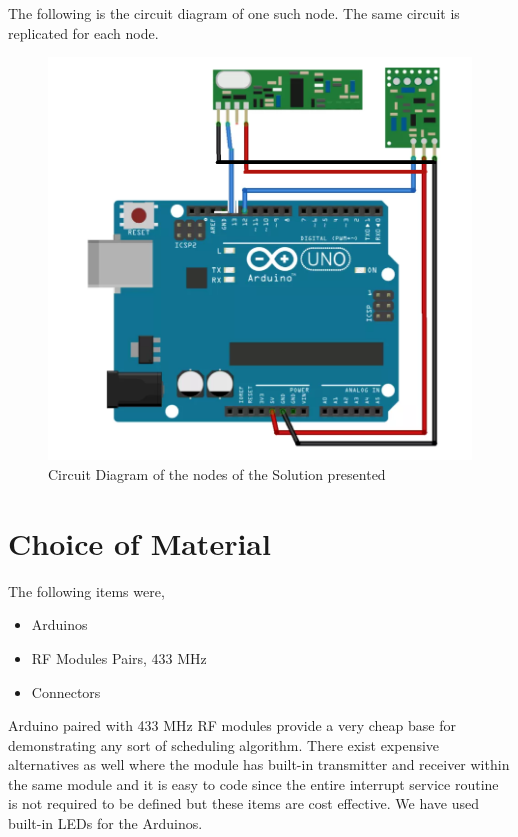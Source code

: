 \documentclass[12pt]{article}
\begin{document}
 The following is the circuit diagram of one such node. The same circuit is replicated for each node.  
 
 \begin{figure}[h]
 \centering
 \includegraphics[scale = 0.35]{circuit1.PNG}
 \caption{Circuit Diagram of the nodes of the Solution presented}
 \end{figure}
 

\section{Choice of Material}

 The following items were,
 
 \begin{itemize}
 \item Arduinos
 \item RF Modules Pairs, 433 MHz
 \item Connectors
 \end{itemize}
 
 Arduino paired with 433 MHz RF modules provide a very cheap base for demonstrating any sort of scheduling algorithm. There exist expensive alternatives as well where the module has built-in transmitter and receiver within the same module and it is easy to code since the entire interrupt service routine is not required to be defined but these items are cost effective. We have used built-in LEDs for the Arduinos. 
\end{document}

